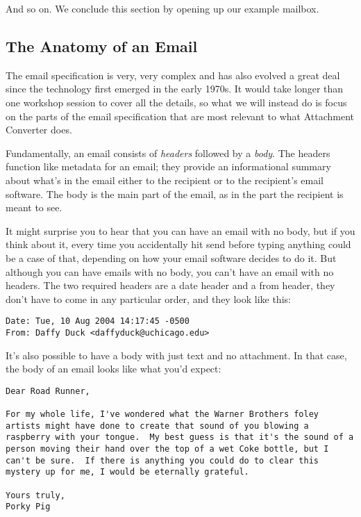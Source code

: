 \documentclass[11pt]{article}
\begin{document}
And so on.  We conclude this section by opening up our example
mailbox.

\subsection{The Anatomy of an Email}
\label{sec:org838cda3}

The email specification is very, very complex and has also evolved a
great deal since the technology first emerged in the early 1970s.  It
would take longer than one workshop session to cover all the details,
so what we will instead do is focus on the parts of the email
specification that are most relevant to what Attachment Converter
does.

Fundamentally, an email consists of \emph{headers} followed by a \emph{body}.
The headers function like metadata for an email; they provide an
informational summary about what's in the email either to the
recipient or to the recipient's email software.  The body is the main
part of the email, as in the part the recipient is meant to see.

It might surprise you to hear that you can have an email with no body,
but if you think about it, every time you accidentally hit send before
typing anything could be a case of that, depending on how your email
software decides to do it.  But although you can have emails with no
body, you can't have an email with no headers.  The two required
headers are a date header and a from header, they don't have to come
in any particular order, and they look like this:

\begin{verbatim}
Date: Tue, 10 Aug 2004 14:17:45 -0500
From: Daffy Duck <daffyduck@uchicago.edu>
\end{verbatim}

It's also possible to have a body with just text and no attachment. In
that case, the body of an email looks like what you'd expect:

\begin{verbatim}
Dear Road Runner,

For my whole life, I've wondered what the Warner Brothers foley
artists might have done to create that sound of you blowing a
raspberry with your tongue.  My best guess is that it's the sound of a
person moving their hand over the top of a wet Coke bottle, but I
can't be sure.  If there is anything you could do to clear this
mystery up for me, I would be eternally grateful.

Yours truly,
Porky Pig
\end{verbatim}
\end{document}
